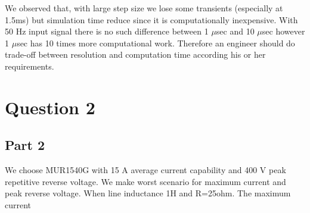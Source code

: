 \documentclass[fleqn, a4paper]{article}
\begin{document}
We observed that, with large step size we lose some transients (especially at 1.5ms) but simulation time reduce since it is computationally inexpensive. With 50 Hz input signal there is no such difference between 1 $\mu$sec and 10 $\mu$sec however 1 $\mu$sec has 10 times more computational work. Therefore an engineer should do trade-off between resolution and computation time according his or her requirements.  
\section*{Question 2}
\subsection*{Part 2}
We choose MUR1540G with 15 A average current capability and 400 V peak repetitive reverse voltage. We make worst scenario for maximum current and peak reverse voltage. 
When line inductance 1H and R=25ohm. The maximum current 
\end{document}
